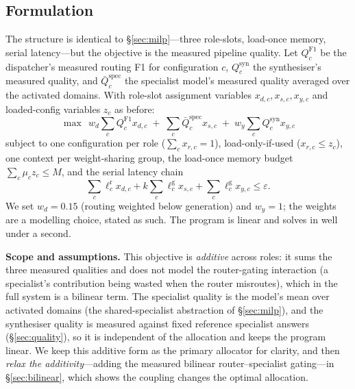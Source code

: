\documentclass[11pt]{article}
\newcommand{\eps}{\varepsilon}
\begin{document}
\subsection{Formulation}
The structure is identical to §\ref{sec:milp}---three role-slots, load-once
memory, serial latency---but the objective is the measured pipeline quality.
Let $Q^{\mathrm{F1}}_c$ be the dispatcher's measured routing F1 for configuration
$c$, $Q^{\mathrm{syn}}_c$ the synthesiser's measured quality, and
$\bar Q^{\mathrm{spec}}_c$ the specialist model's measured quality averaged over
the activated domains. With role-slot assignment variables $x_{d,c},x_{s,c},x_{y,c}$
and loaded-config variables $z_c$ as before:
\begin{equation}
\max\ \ w_d \!\sum_c Q^{\mathrm{F1}}_c x_{d,c}
\;+\; \sum_c \bar Q^{\mathrm{spec}}_c x_{s,c}
\;+\; w_y \!\sum_c Q^{\mathrm{syn}}_c x_{y,c}
\label{eq:qobj}
\end{equation}
subject to one configuration per role
($\sum_c x_{r,c}{=}1$), load-only-if-used ($x_{r,c}\le z_c$), one context per
weight-sharing group, the load-once memory budget
$\sum_c \mu_c z_c \le M$, and the serial latency chain
\begin{equation}
\sum_c \ell^{\mathrm{r}}_c x_{d,c} + k\!\sum_c \ell^{\mathrm{g}}_c x_{s,c}
+ \sum_c \ell^{\mathrm{g}}_c x_{y,c} \le \eps .
\label{eq:qlat}
\end{equation}
We set $w_d{=}0.15$ (routing weighted below generation) and $w_y{=}1$; the
weights are a modelling choice, stated as such. The program is linear and solves
in well under a second.

\textbf{Scope and assumptions.} This objective is \emph{additive} across roles: it
sums the three measured qualities and does not model the router-gating interaction
(a specialist's contribution being wasted when the router misroutes), which in the
full system is a bilinear term. The specialist quality is the model's mean over
activated domains (the shared-specialist abstraction of §\ref{sec:milp}), and the
synthesiser quality is measured against fixed reference specialist answers
(§\ref{sec:quality}), so it is independent of the allocation and keeps the program
linear. We keep this additive form as the primary allocator for clarity, and then
\emph{relax the additivity}---adding the measured bilinear router--specialist
gating---in §\ref{sec:bilinear}, which shows the coupling changes the optimal
allocation.
\end{document}

